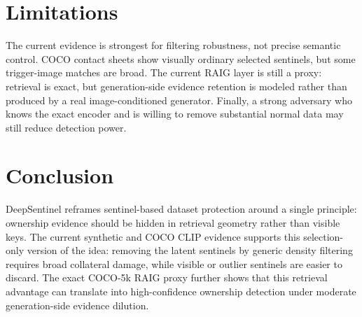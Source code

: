\documentclass[letterpaper]{article}
\begin{document}
\section{Limitations}

The current evidence is strongest for filtering robustness, not precise semantic
control. COCO contact sheets show visually ordinary selected sentinels, but some
trigger-image matches are broad. The current RAIG layer is still a proxy:
retrieval is exact, but generation-side evidence retention is modeled rather
than produced by a real image-conditioned generator. Finally, a strong adversary
who knows the exact encoder and is willing to remove substantial normal data may
still reduce detection power.

\section{Conclusion}

DeepSentinel reframes sentinel-based dataset protection around a single
principle: ownership evidence should be hidden in retrieval geometry rather than
visible keys. The current synthetic and COCO CLIP evidence supports this
selection-only version of the idea: removing the latent sentinels by generic
density filtering requires broad collateral damage, while visible or outlier
sentinels are easier to discard. The exact COCO-5k RAIG proxy further shows that
this retrieval advantage can translate into high-confidence ownership detection
under moderate generation-side evidence dilution.


\end{document}
